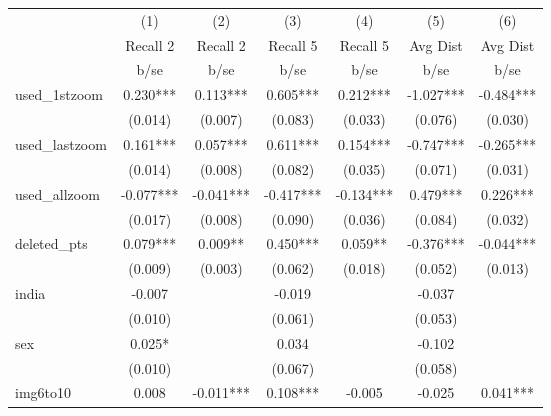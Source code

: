{
\def\sym#1{\ifmmode^{#1}\else\(^{#1}\)\fi}
\begin{tabular}{l*{6}{c}}
\hline\hline
            &\multicolumn{1}{c}{(1)}   &\multicolumn{1}{c}{(2)}   &\multicolumn{1}{c}{(3)}   &\multicolumn{1}{c}{(4)}   &\multicolumn{1}{c}{(5)}   &\multicolumn{1}{c}{(6)}   \\
            &    Recall 2   &    Recall 2   &    Recall 5   &    Recall 5   &    Avg Dist   &    Avg Dist   \\
            &        b/se   &        b/se   &        b/se   &        b/se   &        b/se   &        b/se   \\
\hline
used\_1stzoom&       0.230***&       0.113***&       0.605***&       0.212***&      -1.027***&      -0.484***\\
            &     (0.014)   &     (0.007)   &     (0.083)   &     (0.033)   &     (0.076)   &     (0.030)   \\
[1em]
used\_lastzoom&       0.161***&       0.057***&       0.611***&       0.154***&      -0.747***&      -0.265***\\
            &     (0.014)   &     (0.008)   &     (0.082)   &     (0.035)   &     (0.071)   &     (0.031)   \\
[1em]
used\_allzoom&      -0.077***&      -0.041***&      -0.417***&      -0.134***&       0.479***&       0.226***\\
            &     (0.017)   &     (0.008)   &     (0.090)   &     (0.036)   &     (0.084)   &     (0.032)   \\
[1em]
deleted\_pts &       0.079***&       0.009** &       0.450***&       0.059** &      -0.376***&      -0.044***\\
            &     (0.009)   &     (0.003)   &     (0.062)   &     (0.018)   &     (0.052)   &     (0.013)   \\
[1em]
india       &      -0.007   &               &      -0.019   &               &      -0.037   &               \\
            &     (0.010)   &               &     (0.061)   &               &     (0.053)   &               \\
[1em]
sex         &       0.025*  &               &       0.034   &               &      -0.102   &               \\
            &     (0.010)   &               &     (0.067)   &               &     (0.058)   &               \\
[1em]
img6to10    &       0.008   &      -0.011***&       0.108***&      -0.005   &      -0.025   &       0.041***\\

\end{tabular}}
